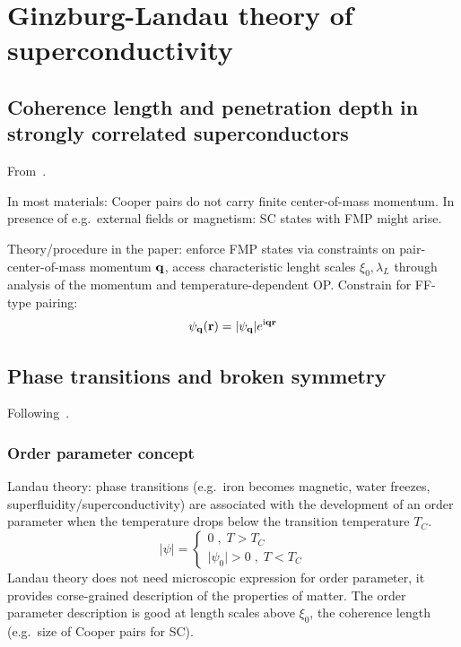 \documentclass[../main.tex]{subfiles}
\begin{document}
\chapter{Ginzburg-Landau theory of superconductivity}\label{ch:Ginzburg-Landau theory of superconductivity}

\section{Coherence length and penetration depth in strongly correlated superconductors}

From~\cite{wittBypassingLatticeBCSBEC2024}.

In most materials: Cooper pairs do not carry finite center-of-mass momentum.
In presence of e.g.\ external fields or magnetism: SC states with FMP might arise.

Theory/procedure in the paper: enforce FMP states via constraints on pair-center-of-mass momentum \(\bm{\mathrm{q}}\), access characteristic lenght scales \(\xi_0, \lambda_L\) through analysis of the momentum and temperature-dependent OP\@.
Constrain for FF-type pairing:
\begin{equation}
    \psi_{\bm{\mathrm{q}}} (\bm{\mathrm{r}}) = \vert \psi_{\bm{\mathrm{q}}} \vert e^{\mathrm{i} \bm{\mathrm{q}} \bm{\mathrm{r}}}
\end{equation}


\section{Phase transitions and broken symmetry}

Following~\cite[ch. 11]{colemanIntroductionManyBodyPhysics2015}.

\subsection{Order parameter concept}

Landau theory: phase transitions (e.g.\ iron becomes magnetic, water freezes, superfluidity/superconductivity) are associated with the development of an order parameter when the temperature drops below the transition temperature \(T_C\).
\begin{equation}
    \vert \psi \vert =
    \begin{cases}
        0\;,\; T > T_C \\
        \vert \psi_0 \vert > 0 \;,\; T < T_C
    \end{cases}
\end{equation}
Landau theory does not need microscopic expression for order parameter, it provides corse-grained description of the properties of matter.
The order parameter description is good at length scales above \(\xi_0\), the coherence length (e.g.\ size of Cooper pairs for SC).
\end{document}
